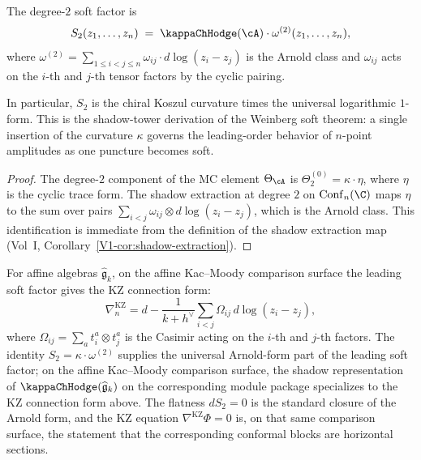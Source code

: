\begin{theorem}
The degree-$2$ soft factor is
\begin{equation}
S_2(z_1, \ldots, z_n)
\;=\;
\kappaChHodge(\cA) \cdot \omega^{(2)}(z_1, \ldots, z_n),
\end{equation}
where $\omega^{(2)} = \sum_{1 \leq i < j \leq n} \omega_{ij} \cdot d\log(z_i - z_j)$
is the Arnold class and $\omega_{ij}$ acts on the $i$-th and $j$-th tensor factors
by the cyclic pairing.

In particular, $S_2$ is the chiral Koszul curvature times the universal
logarithmic $1$-form. This is the shadow-tower derivation of the Weinberg soft
theorem: a single insertion of the curvature $\kappa$ governs the leading-order
behavior of $n$-point amplitudes as one puncture becomes soft.
\end{theorem}

\begin{proof}
The degree-$2$ component of the MC element $\Theta_\cA$ is
$\Theta^{(0)}_2 = \kappa \cdot \eta$, where $\eta$ is the cyclic trace form.
The shadow extraction at degree $2$ on $\mathrm{Conf}_n(\C)$ maps $\eta$ to the
sum over pairs $\sum_{i < j} \omega_{ij} \otimes d\log(z_i - z_j)$, which is the
Arnold class. This identification is immediate from the definition of the shadow
extraction map (Vol~I, Corollary~\ref*{V1-cor:shadow-extraction}).
\end{proof}

\begin{remark}[KZ connection]
For affine algebras $\widehat{\mathfrak{g}}_k$, on the affine Kac--Moody
comparison surface the leading soft factor gives the KZ connection form:
\[
\nabla^{\mathrm{KZ}}_n = d - \frac{1}{k + h^\vee} \sum_{i < j}
\Omega_{ij} \, d\log(z_i - z_j),
\]
where $\Omega_{ij} = \sum_a t^a_i \otimes t^a_j$ is the Casimir acting on the
$i$-th and $j$-th factors. The identity $S_2 = \kappa \cdot \omega^{(2)}$
supplies the universal Arnold-form part of the leading soft factor; on the
affine Kac--Moody comparison surface, the shadow representation of
$\kappaChHodge(\widehat{\mathfrak{g}}_k)$ on the corresponding module package
specializes to the KZ connection form above.
The flatness $dS_2 = 0$ is the standard closure of the Arnold form, and the
KZ equation $\nabla^{\mathrm{KZ}} \Phi = 0$ is, on that same comparison
surface, the statement that the corresponding conformal blocks are
horizontal sections.
\end{remark}

